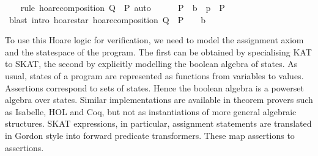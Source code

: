 \documentclass{llncs}
\begin{document}
\begin{isabellebody}
%
\isadelimproof
\ \ %
\endisadelimproof
%
\isatagproof
{}\isamarkupfalse%
\ {}rule\ hoare{}composition{}\ {}Q\ {}\ P{}{}\ auto{}\isanewline
\ \ \ \ \isamarkupfalse%
\ {}P\ {}\ {}b\ {}\ p{}\ {}\ P{}\isanewline
\ \ \ \ \ \ \isamarkupfalse%
\ {}blast\ intro{}\ hoare{}star\ hoare{}composition{}\ {}Q\ {}\ {}P\ {}\ {}\ {}\ b{}{}{}\isanewline
\ \ \isamarkupfalse%
%
\endisatagproof
\end{isabellebody}

To use this Hoare logic for verification, we need to model the
assignment axiom and the statespace of the program. The first can be
obtained by specialising KAT to SKAT, the second by explicitly
modelling the boolean algebra of states. As usual, states of a program
are represented as functions from variables to values. Assertions
correspond to sets of states. Hence the boolean algebra is a powerset
algebra over states. Similar implementations are available in theorem
provers such as Isabelle, HOL and Coq, but not as instantiations of
more general algebraic structures. SKAT expressions, in particular,
assignment statements are translated in Gordon style into forward
predicate transformers. These map assertions to assertions.
\end{document}
